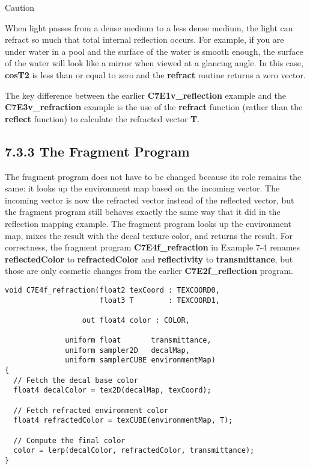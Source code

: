 \documentclass[../main.tex]{subfiles}
\begin{document}
\begin{framed}
Caution

When light passes from a dense medium to a less dense medium, the light can refract so much that total internal reflection occurs. For example, if you are under water in a pool and the surface of the water is smooth enough, the surface of the water will look like a mirror when viewed at a glancing angle. In this case, \textbf{cosT2} is less than or equal to zero and the \textbf{refract} routine returns a zero vector.
\end{framed}

The key difference between the earlier \textbf{C7E1v_reflection} example and the \textbf{C7E3v_refraction} example is the use of the \textbf{refract} function (rather than the \textbf{reflect} function) to calculate the refracted vector \textbf{T}. 

\subsection{7.3.3 The Fragment Program}

The fragment program does not have to be changed because its role remains the same: it looks up the environment map based on the incoming vector. The incoming vector is now the refracted vector instead of the reflected vector, but the fragment program still behaves exactly the same way that it did in the reflection mapping example. The fragment program looks up the environment map, mixes the result with the decal texture color, and returns the result. For correctness, the fragment program \textbf{C7E4f_refraction} in Example 7-4 renames \textbf{reflectedColor} to \textbf{refractedColor} and \textbf{reflectivity} to \textbf{transmittance}, but those are only cosmetic changes from the earlier \textbf{C7E2f_reflection} program.

\FloatBarrier
\begin{lstlisting}[caption=Example 7-4. The \textbf{C7E4f_refraction} Fragment Program]
void C7E4f_refraction(float2 texCoord : TEXCOORD0,
                      float3 T        : TEXCOORD1,

                  out float4 color : COLOR,

              uniform float       transmittance,
              uniform sampler2D   decalMap,
              uniform samplerCUBE environmentMap)
{
  // Fetch the decal base color
  float4 decalColor = tex2D(decalMap, texCoord);

  // Fetch refracted environment color
  float4 refractedColor = texCUBE(environmentMap, T);

  // Compute the final color
  color = lerp(decalColor, refractedColor, transmittance);
}
\end{lstlisting}
\FloatBarrier
\end{document}
